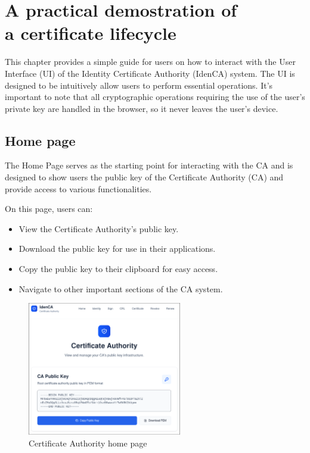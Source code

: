 \chapter{A practical demostration of \\a certificate lifecycle}

This chapter provides a simple guide for users on how to interact with the User Interface (UI) 
of the Identity Certificate Authority (IdenCA) system. The UI is designed to be intuitively 
allow users to perform essential operations. It's important to note that all cryptographic operations
requiring the use of the user's private key are handled in the browser, so it never leaves the 
user's device.

\section{Home page}
The Home Page serves as the starting point for interacting with the CA and is designed to show 
users the public key of the Certificate Authority (CA) and provide access to various functionalities.

On this page, users can:
\begin{itemize}
    \item View the Certificate Authority's public key.
    \item Download the public key for use in their applications.
    \item Copy the public key to their clipboard for easy access.
    \item Navigate to other important sections of the CA system.
\end{itemize}
\begin{figure}[h!]
    \centering
    \includegraphics[keepaspectratio, width=0.6\textwidth]{Pic/1_ca_pub_key.png}
    \caption{Certificate Authority home page}
    \label{fig:homepage}
\end{figure}

